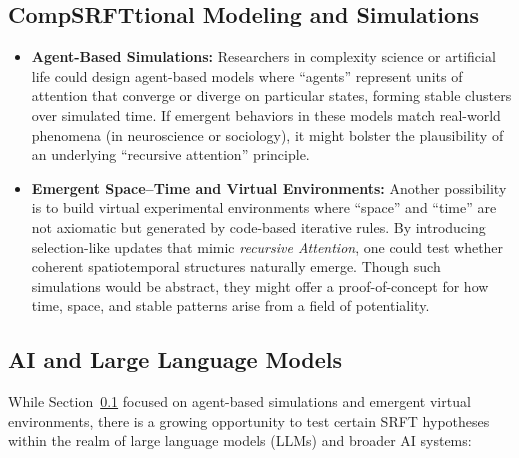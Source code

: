 \documentclass[12pt,a4paper]{article}
\begin{document}
\subsection{CompSRFTtional Modeling and Simulations}
\label{subsec:compSRFTtional-modeling}
\begin{itemize}
    \item \textbf{Agent-Based Simulations:}
    Researchers in complexity science or artificial life could design agent-based models where “agents” represent units of attention that converge or diverge on particular states, forming stable clusters over simulated time. If emergent behaviors in these models match real-world phenomena (in neuroscience or sociology), it might bolster the plausibility of an underlying “recursive attention” principle.

    \item \textbf{Emergent Space–Time and Virtual Environments:}
    Another possibility is to build virtual experimental environments where “space” and “time” are not axiomatic but generated by code-based iterative rules. By introducing selection-like updates that mimic \emph{recursive Attention}, one could test whether coherent spatiotemporal structures naturally emerge. Though such simulations would be abstract, they might offer a proof-of-concept for how time, space, and stable patterns arise from a field of potentiality.
\end{itemize}

\subsection{AI and Large Language Models}
\label{subsec:ai-llms-future}

While Section~\ref{subsec:compSRFTtional-modeling} focused on agent-based simulations and emergent virtual environments, there is a growing opportunity to test certain SRFT hypotheses within the realm of large language models (LLMs) and broader AI systems:
\end{document}
